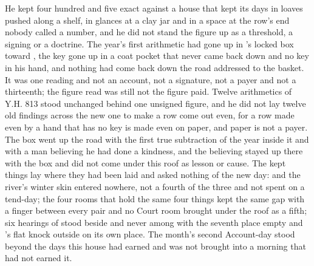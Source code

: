 He kept four hundred and five exact against a house that kept its days in loaves pushed along a shelf, in glances at a clay jar and in a space at the row's end nobody called a number, and he did not stand the figure up as a threshold, a signing or a doctrine. The year's first arithmetic had gone up  in 's locked box toward , the key gone up in a coat pocket that never came back down and no key in his hand, and nothing had come back down the road addressed to the basket. It was one reading and not an account, not a signature, not a payer and not a thirteenth; the figure read was still not the figure paid. Twelve arithmetics of Y.H. 813 stood unchanged behind one unsigned figure, and he did not lay twelve old findings across the new one to make a row come out even, for a row made even by a hand that has no key is made even on paper, and paper is not a payer. The box went up the road with the first true subtraction of the year inside it and with a man believing he had done a kindness, and the believing stayed up there with the box and did not come under this roof as lesson or cause. The kept things lay where they had been laid and asked nothing of the new day:  and the river's winter skin entered nowhere, not a fourth of the three and not spent on a tend-day; the four rooms that hold the same four things kept the same gap with a finger between every pair and no Court room brought under the roof as a fifth; six hearings of  stood beside and never among with the seventh place empty and 's flat knock outside on its own place. The month's second Account-day stood beyond the days this house had earned and was not brought into a morning that had not earned it.


